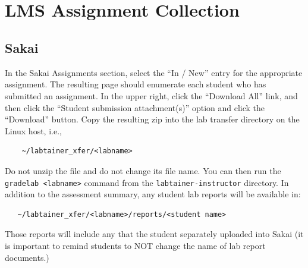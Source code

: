 \documentclass[12pt]{article}
\begin{document}
\newpage
\appendix
\section{\\LMS Assignment Collection}
\label{lms collection}
\subsection{Sakai}
In the Sakai Assignments section, select the ``In / New'' entry for the appropriate assignment.
The resulting page should enumerate each student who has submitted an assignment.  In the upper right,
click the ``Download All'' link, and then click the ``Student submission attachment(s)'' option and
click the ``Download'' button.  Copy the resulting zip into the lab transfer directory 
on the Linux host, i.e.,
\begin{verbatim}
    ~/labtainer_xfer/<labname>
\end{verbatim}
\noindent Do not unzip the file and do not change its file name.
You can then run the {\tt gradelab <labname>} command from the {\tt labtainer-instructor} directory.
In addition to the assessment summary, any student lab reports will be available in:
\begin{verbatim}
   ~/labtainer_xfer/<labname>/reports/<student name> 
\end{verbatim}
\noindent Those reports will include any that the student separately uploaded into Sakai (it is 
important to remind students to NOT change the name of lab report documents.)
\end{document}
